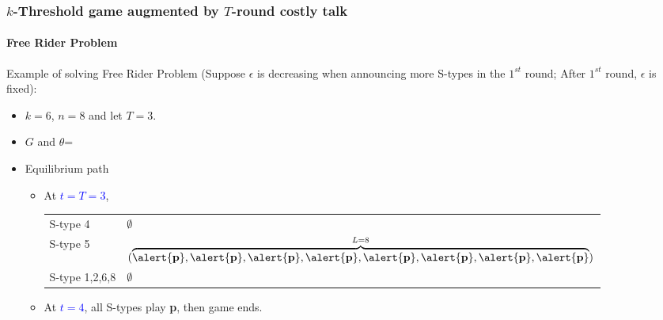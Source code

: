 \documentclass[9pt]{beamer}
\begin{document}
\begin{frame}
  \frametitle{$k$-Threshold game augmented by $T$-round costly talk}
  \framesubtitle{Free Rider Problem}
Example of solving Free Rider Problem (Suppose $\epsilon$ \alert{is decreasing} when announcing \alert{more} S-types in the \alert{$1^{st}$} round; After $1^{st}$ round, $\epsilon$ is fixed):
\begin{itemize}
\item $k=6$, $n=8$ and let $T=3$.
\item $G$ and $\theta$=
\begin{center}
\end{center}
\end{itemize}

\begin{itemize}
\item Equilibrium path
\begin{itemize}
\item 

At \textcolor{blue}{$t=T=3$}, 
\begin{table}[h]
\begin{tabular}{ll }
S-type 4 & $\emptyset$\\
S-type 5 & $(\overbrace{\alert{\textbf{p}},\alert{\textbf{p}},\alert{\textbf{p}},\alert{\textbf{p}},\alert{\textbf{p}},\alert{\textbf{p}},\alert{\textbf{p}},\alert{\textbf{p}}}^{L=8})$\\
S-type 1,2,6,8 & $\emptyset$
\end{tabular}
\end{table}

\pause
\item At \textcolor{blue}{$t=4$}, all S-types play \textbf{p}, then game ends.

\end{itemize}

\end{itemize}



\end{frame}
\end{document}
